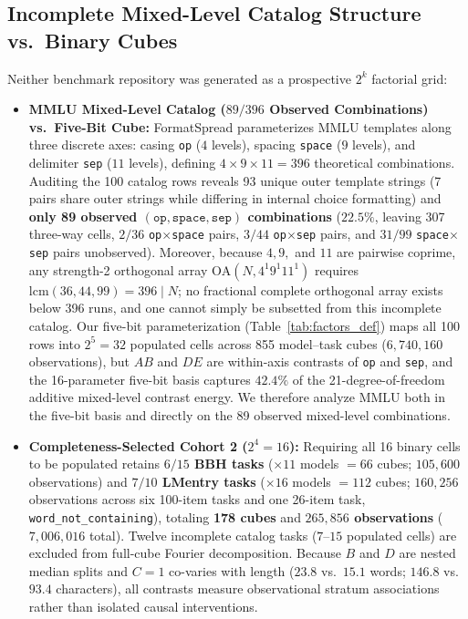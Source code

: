 \documentclass[11pt,a4paper]{article}
\begin{document}
\subsection{Incomplete Mixed-Level Catalog Structure vs.\ Binary Cubes}
Neither benchmark repository was generated as a prospective $2^k$ factorial grid:
\begin{itemize}[leftmargin=*,nosep]
    \item \textbf{MMLU Mixed-Level Catalog ($89/396$ Observed Combinations) vs.\ Five-Bit Cube:} FormatSpread parameterizes MMLU templates along three discrete axes: casing \texttt{op} ($4$ levels), spacing \texttt{space} ($9$ levels), and delimiter \texttt{sep} ($11$ levels), defining $4 \times 9 \times 11 = 396$ theoretical combinations. Auditing the 100 catalog rows reveals 93 unique outer template strings (7 pairs share outer strings while differing in internal choice formatting) and \textbf{only 89 observed $(\texttt{op}, \texttt{space}, \texttt{sep})$ combinations} ($22.5\%$, leaving 307 three-way cells, $2/36$ \texttt{op}$\times$\texttt{space} pairs, $3/44$ \texttt{op}$\times$\texttt{sep} pairs, and $31/99$ \texttt{space}$\times$\texttt{sep} pairs unobserved). Moreover, because $4, 9,$ and $11$ are pairwise coprime, any strength-2 orthogonal array $\mathrm{OA}(N, 4^1 9^1 11^1)$ requires $\mathrm{lcm}(36, 44, 99) = 396 \mid N$; no fractional complete orthogonal array exists below 396 runs, and one cannot simply be subsetted from this incomplete catalog. Our five-bit parameterization (Table~\ref{tab:factors_def}) maps all 100 rows into $2^5=32$ populated cells across 855 model--task cubes ($6{,}740{,}160$ observations), but $AB$ and $DE$ are within-axis contrasts of \texttt{op} and \texttt{sep}, and the 16-parameter five-bit basis captures $42.4\%$ of the 21-degree-of-freedom additive mixed-level contrast energy. We therefore analyze MMLU both in the five-bit basis and directly on the 89 observed mixed-level combinations.
    \item \textbf{Completeness-Selected Cohort 2 ($2^4=16$):} Requiring all 16 binary cells to be populated retains \textbf{$6/15$ BBH tasks} ($\times 11$ models $= 66$ cubes; $105{,}600$ observations) and \textbf{$7/10$ LMentry tasks} ($\times 16$ models $= 112$ cubes; $160{,}256$ observations across six 100-item tasks and one 26-item task, \texttt{word\_not\_containing}), totaling \textbf{178 cubes} and \textbf{$265{,}856$ observations} ($7{,}006{,}016$ total). Twelve incomplete catalog tasks ($7$--$15$ populated cells) are excluded from full-cube Fourier decomposition. Because $B$ and $D$ are nested median splits and $C=1$ co-varies with length ($23.8$ vs.\ $15.1$ words; $146.8$ vs.\ $93.4$ characters), all contrasts measure observational stratum associations rather than isolated causal interventions.

\end{itemize}
\end{document}
